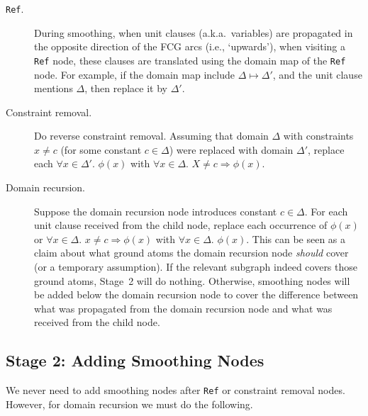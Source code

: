 \documentclass{article}
\theoremstyle{definition}
\begin{document}
\begin{description}
  \item[\texttt{Ref}.] During smoothing, when unit clauses (a.k.a.\ variables)
        are propagated in the opposite direction of the FCG arcs (i.e.,
        `upwards'), when visiting a \texttt{Ref} node, these clauses are
        translated using the domain map of the \texttt{Ref} node. For example,
        if the domain map include $\Delta \mapsto \Delta'$, and the unit clause
        mentions $\Delta$, then replace it by $\Delta'$.
  \item[Constraint removal.] Do reverse constraint removal. Assuming that
        domain $\Delta$ with constraints $x \ne c$ (for some constant
        $c \in \Delta$) were replaced with domain $\Delta'$, replace each
        $\forall x \in \Delta'\text{. }\phi(x)$ with
        $\forall x \in \Delta\text{. }X \ne c \Rightarrow \phi(x)$.
  \item[Domain recursion.] Suppose the domain recursion node introduces constant
        $c \in \Delta$. For each unit clause received from the child node,
        replace each occurrence of $\phi(x)$ or $\forall x \in \Delta\text{.
        } x \ne c \Rightarrow \phi(x)$ with $\forall x \in \Delta\text{.
        }\phi(x)$. This can be seen as a claim about what ground atoms the
        domain recursion node \emph{should} cover (or a temporary assumption).
        If the relevant subgraph indeed covers those ground atoms, Stage~2 will
        do nothing. Otherwise, smoothing nodes will be added below the domain
        recursion node to cover the difference between what was propagated from
        the domain recursion node and what was received from the child node.
\end{description}

\subsection{Stage 2: Adding Smoothing Nodes}

We never need to add smoothing nodes after \texttt{Ref} or constraint removal
nodes. However, for domain recursion we must do the following.
\end{document}
